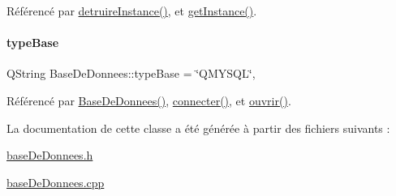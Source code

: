 Référencé par \hyperlink{class_base_de_donnees_a457401c0816b888c77ce915997545f4e}{detruire\+Instance()}, et \hyperlink{class_base_de_donnees_a80028aa2b6b4fbf30fb2e36357b7d3d3}{get\+Instance()}.

\mbox{\label{class_base_de_donnees_ab682b82167f494496a6531bfe522b42b}} 
\paragraph{\texorpdfstring{type\+Base}{typeBase}}
{\footnotesize\ttfamily Q\+String Base\+De\+Donnees\+::type\+Base = \char`\"{}Q\+M\+Y\+S\+QL\char`\"{}\hspace{0.3cm}{\ttfamily [static]}, {\ttfamily [private]}}



Référencé par \hyperlink{class_base_de_donnees_a10dd177f1008f675ab78c2221b2a6750}{Base\+De\+Donnees()}, \hyperlink{class_base_de_donnees_ac20da193923a9bfea5e38ee5a54820cd}{connecter()}, et \hyperlink{class_base_de_donnees_a7f6a5510b08017b0d99115a84252f186}{ouvrir()}.



La documentation de cette classe a été générée à partir des fichiers suivants \+:\begin{DoxyCompactItemize}
\item 
\hyperlink{base_de_donnees_8h}{base\+De\+Donnees.\+h}\item 
\hyperlink{base_de_donnees_8cpp}{base\+De\+Donnees.\+cpp}\end{DoxyCompactItemize}
